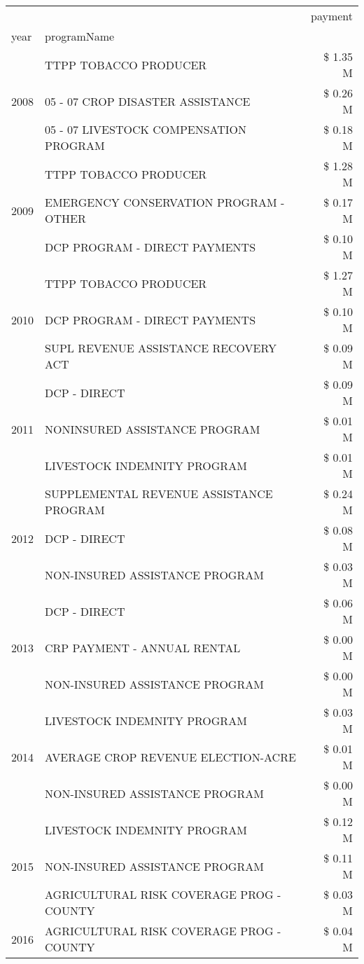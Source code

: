 \begin{tabular}{llr}
\toprule
 &  & payment \\
year & programName &  \\
\midrule
\multirow[t]{3}{*}{2008} & TTPP TOBACCO PRODUCER & \$ 1.35 M \\
 & 05 - 07 CROP DISASTER ASSISTANCE & \$ 0.26 M \\
 & 05 - 07 LIVESTOCK COMPENSATION PROGRAM & \$ 0.18 M \\
\cline{1-3}
\multirow[t]{3}{*}{2009} & TTPP TOBACCO PRODUCER & \$ 1.28 M \\
 & EMERGENCY CONSERVATION PROGRAM - OTHER & \$ 0.17 M \\
 & DCP PROGRAM - DIRECT PAYMENTS & \$ 0.10 M \\
\cline{1-3}
\multirow[t]{3}{*}{2010} & TTPP TOBACCO PRODUCER & \$ 1.27 M \\
 & DCP PROGRAM - DIRECT PAYMENTS & \$ 0.10 M \\
 & SUPL REVENUE ASSISTANCE RECOVERY ACT & \$ 0.09 M \\
\cline{1-3}
\multirow[t]{3}{*}{2011} & DCP - DIRECT & \$ 0.09 M \\
 & NONINSURED ASSISTANCE PROGRAM & \$ 0.01 M \\
 & LIVESTOCK INDEMNITY PROGRAM & \$ 0.01 M \\
\cline{1-3}
\multirow[t]{3}{*}{2012} & SUPPLEMENTAL REVENUE ASSISTANCE PROGRAM & \$ 0.24 M \\
 & DCP - DIRECT & \$ 0.08 M \\
 & NON-INSURED ASSISTANCE PROGRAM & \$ 0.03 M \\
\cline{1-3}
\multirow[t]{3}{*}{2013} & DCP - DIRECT & \$ 0.06 M \\
 & CRP PAYMENT - ANNUAL RENTAL & \$ 0.00 M \\
 & NON-INSURED ASSISTANCE PROGRAM & \$ 0.00 M \\
\cline{1-3}
\multirow[t]{3}{*}{2014} & LIVESTOCK INDEMNITY PROGRAM & \$ 0.03 M \\
 & AVERAGE CROP REVENUE ELECTION-ACRE & \$ 0.01 M \\
 & NON-INSURED ASSISTANCE PROGRAM & \$ 0.00 M \\
\cline{1-3}
\multirow[t]{3}{*}{2015} & LIVESTOCK INDEMNITY PROGRAM & \$ 0.12 M \\
 & NON-INSURED ASSISTANCE PROGRAM & \$ 0.11 M \\
 & AGRICULTURAL RISK COVERAGE PROG - COUNTY & \$ 0.03 M \\
\cline{1-3}
\multirow[t]{3}{*}{2016} & AGRICULTURAL RISK COVERAGE PROG - COUNTY & \$ 0.04 M \\

\end{tabular}
